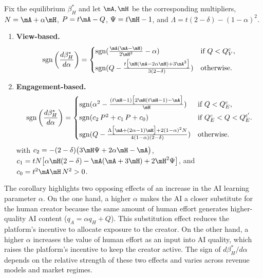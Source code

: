 \begin{corollary}\label{cor:alpha_beta}
Fix the equilibrium $\beta_H^*$ and let $\mA,\mH$ be the corresponding multipliers,
$N=\mA+\alpha\mH$, $P=t\mA-Q$, $\Psi=t\mH-1$, and $\Lambda=t(2-\delta)-(1-\alpha)^2$.
\medskip
\begin{enumerate}
    \item \textbf{View-based.}  
    \[
    \operatorname{sgn}\left(\frac{d\beta_H^*}{d\alpha}\right)=
    \begin{cases}
     \operatorname{sgn}(\frac{\mA(\mA-\mH)}{2\mH^2}-\alpha) & \text{if } Q<Q^{c}_{V},\\[4pt]
     \operatorname{sgn}(Q - \frac{t\bigl[\mH(\mA-2\alpha\mH)+3\mA^2\bigr]}{3(2-\delta)}) & \text{otherwise.}
    \end{cases}
    \]
    \item \textbf{Engagement-based.} 
    \[
    \operatorname{sgn}\left(\frac{d\beta_H^*}{d\alpha}\right)=
    \begin{cases}
     \operatorname{sgn}(\alpha^2 - \frac{(t\mH-1)\bigl[2\mH(t\mH-1)-\mA\bigr]}{\mH}) & \text{if } Q<Q^{c}_{E},\\[4pt]
     \operatorname{sgn}(c_2\,P^2 + c_1\,P + c_0 ) & \text{if } Q_E^c < Q < Q_E^{\sf c'}.\\[4pt]
     \operatorname{sgn}(Q - \frac{\Lambda\bigl[\mA+(2\alpha-1)\mH\bigr] + 2(1-\alpha)^2 N}{4(1-\alpha)(2-\delta)}) & \text{otherwise.}
    \end{cases}
    \]
    with $c_2 = -(2-\delta)\bigl(3\mH\Psi + 2\alpha\mH - \mA\bigr)$, $c_1 = tN\bigl[\alpha\mH(2-\delta) - \mA(\mA+3\mH) + 2\mH^2\Psi\bigr]$, and $c_0 = t^2\mA\mH\,N^2 > 0$.
\end{enumerate}
\end{corollary}

The corollary highlights two opposing effects of an increase in the AI learning parameter $\alpha$. On the one hand, a higher $\alpha$ makes the AI a closer substitute for the human creator because the same amount of human effort generates higher-quality AI content ($q_A=\alpha q_H+Q$). This substitution effect reduces the platform's incentive to allocate exposure to the creator. On the other hand, a higher $\alpha$ increases the value of human effort as an input into AI quality, which raises the platform's incentive to keep the creator active. The sign of $d\beta_H^*/d\alpha$ depends on the relative strength of these two effects and varies across revenue models and market regimes.


